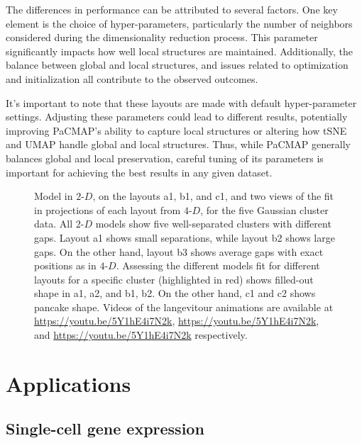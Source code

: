 \documentclass[
  12pt]{article}
\newcommand\gD{$2\text{-}D$}
\begin{document}
The differences in performance can be attributed to several factors. One
key element is the choice of hyper-parameters, particularly the number
of neighbors considered during the dimensionality reduction process.
This parameter significantly impacts how well local structures are
maintained. Additionally, the balance between global and local
structures, and issues related to optimization and initialization all
contribute to the observed outcomes.

It's important to note that these layouts are made with default
hyper-parameter settings. Adjusting these parameters could lead to
different results, potentially improving PaCMAP's ability to capture
local structures or altering how tSNE and UMAP handle global and local
structures. Thus, while PaCMAP generally balances global and local
preservation, careful tuning of its parameters is important for
achieving the best results in any given dataset.

\begin{figure}[H]


\caption{\label{fig-five-gau-projs}Model in \gD{}, on the layouts a1,
b1, and c1, and two views of the fit in projections of each layout from
\(4\text{-}D\), for the five Gaussian cluster data. All \gD{} models
show five well-separated clusters with different gaps. Layout a1 shows
small separations, while layout b2 shows large gaps. On the other hand,
layout b3 shows average gaps with exact positions as in \(4\text{-}D\).
Assessing the different models fit for different layouts for a specific
cluster (highlighted in red) shows filled-out shape in a1, a2, and b1,
b2. On the other hand, c1 and c2 shows pancake shape. Videos of the
langevitour animations are available at
\url{https://youtu.be/5Y1hE4i7N2k}, \url{https://youtu.be/5Y1hE4i7N2k},
and \url{https://youtu.be/5Y1hE4i7N2k} respectively.}

\end{figure}%

\section{Applications}\label{sec-applications}

\subsection{Single-cell gene
expression}\label{single-cell-gene-expression}
\end{document}
